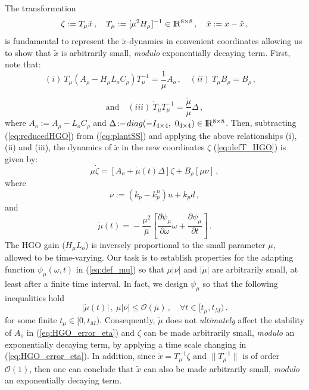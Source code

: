 \documentclass[letterpaper, 10 pt, journal, twocolumn]{IEEEtran}  %
\def\re{{\rm I}\! {\rm R}}
\theoremstyle{plain}
\theoremstyle{definition}
\theoremstyle{remark}
\begin{document}
The transformation \cite{OK:97}
%
\begin{equation}
\zeta:=T_{\mu}\tilde{x}\,, \quad T_\mu:=[\mu^2
H_\mu]^{-1} \in \re^{8 \times 8}\,, \quad \tilde{x}:= x-\hat{x}\,,\label{eq:defT_HGO}
\end{equation}
%
is fundamental to represent the $\tilde{x}$-dynamics in 
convenient coordinates allowing us to show that $\tilde{x}$ is
arbitrarily small, {\em modulo} exponentially decaying term. First,
note that:
%
$$(i) \ T_\mu(A_\rho-H_\mu L_o
C_\rho)T_\mu^{-1}\!=\!\frac{1}{\mu}A_o\,, \quad (ii) \ T_\mu B_\rho\!=\!B_\rho\,, \quad$$ 


$$\mbox{and} \quad
(iii) \ \dot{T}_\mu T_\mu^{-1}\!=\!\frac{\dot{\mu}}{\mu}
\Delta\,,$$
%
where $A_o\!:=\!A_\rho\!-\!L_o C_\rho$ and
$\Delta\!:=\!\mbox{diag}(-I_{4 \times 4}, \ 0_{4 \times 4}) \in \re^{8 \times 8}$.
%
Then, subtracting (\ref{eq:reducedHGO}) from
(\ref{eq:plantSS}) and applying the above
relationships (i),
(ii) and (iii), the dynamics of $\tilde{x}$ 
in the new coordinates $\zeta$ (\ref{eq:defT_HGO}) is given by:
%
\begin{equation}
\mu \dot{\zeta} = [A_o+ \dot{\mu}(t) \Delta] \zeta + B_\rho [\mu
\nu]\,, \label{eq:HGO_error_eta}
\end{equation}
%
where %
%
\begin{equation}
\nu:=(k_p-k_p^n)u+k_p d\,,\label{eq:def_nu}
\end{equation}
%
and
%
\begin{equation}
\dot{\mu}(t)\!=\!-\frac{\mu^2}{\bar{\mu}} \left[\frac{\partial
\psi_\mu}{\partial \omega} \dot{\omega}+\frac{\partial
\psi_\mu}{\partial t}\right]\,. \label{eq:def_mudot}
\end{equation}
%
The HGO gain ($H_\mu L_o$) is inversely proportional to the small parameter $\mu$,
allowed to be time-varying. %
Our task is to establish properties for the adapting
function $\psi_\mu(\omega,t)$ in (\ref{eq:def_mu}) so that $\mu
|\nu|$ and $|\dot{\mu}|$ are arbitrarily small, at least after a
finite time interval. In fact, we design $\psi_\mu$ so that the following inequalities hold
%
\begin{equation}
|\dot{\mu}(t)|\,, \ \mu |\nu| \leq \mathcal{O}(\bar{\mu})\,, \quad
\forall t \in [t_\mu,t_M)\,. \label{eq:mudotmunu}
\end{equation}
%
for  some finite $t_\mu \in [0,t_M)$.  Consequently, $\dot{\mu}$ does not {\em
ultimately} affect the stability of $A_o$ in
(\ref{eq:HGO_error_eta}) and $\zeta$  can be made
arbitrarily small, {\em modulo} an exponentially decaying term, by applying a time scale changing in (\ref{eq:HGO_error_eta}). In addition, since $\tilde{x} = T_\mu^{-1} \zeta$ and $\|T_\mu^{-1}\|$ is of order $\mathcal{O}(1)$, then one can conclude that $\tilde{x}$ can also be made
arbitrarily small, {\em modulo} an exponentially decaying term.
\end{document}
